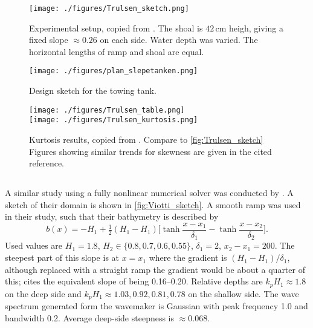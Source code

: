 \documentclass[internal]{sintefmemo}
\begin{document}
\begin{figure}[h!ptb]%
\texttt{[image: ./figures/Trulsen\_sketch.png]}%
\caption{Experimental setup, copied from \citet{trulsen_2020_rampKurtosis}.
The shoal is $42$\,cm heigh, giving a fixed slope $\approx 0.26$ on each side.
Water depth was varied.
The horizontal lengths of ramp and shoal are equal.}%
\label{fig:Trulsen_sketch}%
\end{figure}

\begin{figure}[h!ptb]%
\texttt{[image: ./figures/plan\_slepetanken.png]}%
\caption{Design sketch for the towing tank.}%
\label{fig:plan_slepetanken}%
\end{figure}

\begin{figure}[h!ptb]%
\centering
\texttt{[image: ./figures/Trulsen\_table.png]}\\
\texttt{[image: ./figures/Trulsen\_kurtosis.png]}%
\caption{Kurtosis results, copied from \citet{trulsen_2020_rampKurtosis}.
Compare to \autoref{fig:Trulsen_sketch} 
Figures showing similar trends for skewness are given in the cited reference.}%
\label{fig:Trulsen_kurtosis}%
\end{figure}




\subsection{\citet{viotti_2014_slope}}
A similar study using a fully nonlinear numerical solver was conducted by \citet{viotti_2014_slope}.
A sketch of their domain is shown in \autoref{fig:Viotti_sketch}.
A smooth ramp was used in their study, such that their bathymetry is described by
\[
b(x) = -H_1 + \tfrac12(H_1-H_1)\bigg[\tanh \frac{x-x_1}{\delta_1}-\tanh\frac{x-x_2}{\delta_2}\bigg].
\]
Used values are $H_1=1.8$, $H_2\in\{0.8,0.7,0.6,0.55\}$, $\delta_1 = 2$, $x_2-x_1=200$. 
The steepest part of this slope is at $x=x_1$ where the gradient is $(H_1-H_1)/\delta_1$, although replaced with a straight ramp the gradient would be about a quarter of this; 
\citet{li_2021_step2} cites the equivalent slope of being 0.16--0.20.
Relative depths are $k_p H_1\approx1.8$ on the deep side and $k_p H_1\approx1.03,0.92,0.81,0.78$ on the shallow side. 
The wave spectrum generated form the wavemaker is Gaussian with peak frequency 1.0 and bandwidth 0.2. Average deep-side steepness is $\approx 0.068$.
\end{document}
